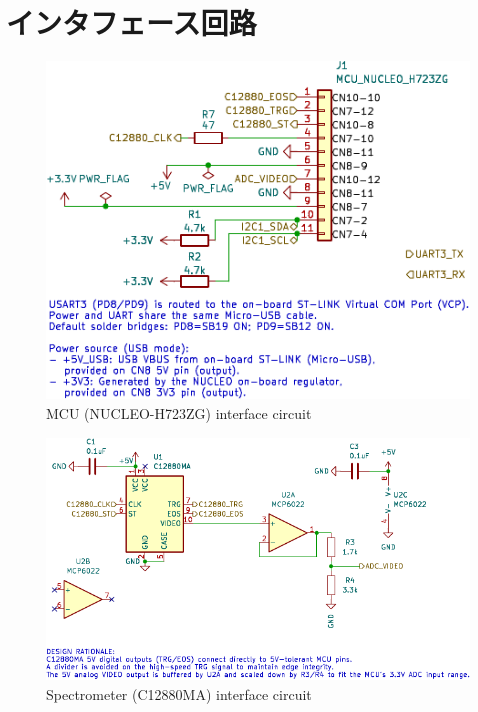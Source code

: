 \documentclass[main]{subfiles}
\begin{document}
\appendix 
\chapter{インタフェース回路}
\label{sec:appendix_figs}

\begin{figure}[h]
  \centering
  \includegraphics[width=0.8\linewidth]{figures/2/AGV_Multisensor-MCU_NUCLEO_H723ZG.pdf}
  \caption{MCU (NUCLEO-H723ZG) interface circuit}
  \label{fig:mcu_circuit}
\end{figure}

\begin{figure}[h]
  \centering
  \includegraphics[width=0.8\linewidth]{figures/2/AGV_Multisensor-Spectrometer_C12880MA.pdf}
  \caption{Spectrometer (C12880MA) interface circuit}
  \label{fig:c12880ma_circuit}
\end{figure}
\end{document}
